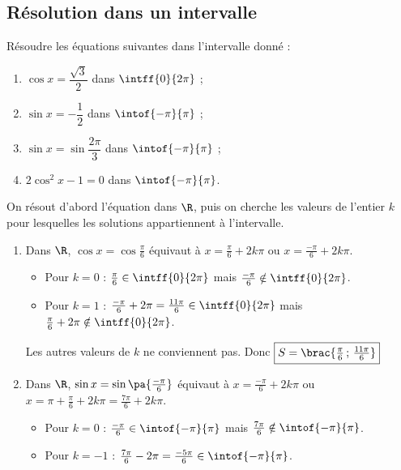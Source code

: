 \newpage

\subsection{Résolution dans un intervalle}

\begin{methode}
	Résoudre les équations suivantes dans l'intervalle donné :

	\begin{enumerate}
		\item $\cos x = \dfrac{\sqrt{3}}{2}$ dans $\intff{0}{2\pi}$ ;
		\item $\sin x = -\dfrac{1}{2}$ dans $\intof{-\pi}{\pi}$ ;
		\item $\sin x = \sin\dfrac{2\pi}{3}$ dans $\intof{-\pi}{\pi}$ ;
		\item $2\cos^2 x - 1 = 0$ dans $\intof{-\pi}{\pi}$.
	\end{enumerate}

	\begin{correction}
		On résout d'abord l'équation dans $\R$, puis on cherche les valeurs de l'entier $k$ pour lesquelles les solutions appartiennent à l'intervalle.

		\begin{enumerate}
			\item Dans $\R$, $\cos x = \cos\frac{\pi}{6}$ équivaut à $x = \frac{\pi}{6} + 2k\pi$ ou $x = \frac{-\pi}{6} + 2k\pi$.

			      \begin{itemize}
				      \item Pour $k = 0$ : $\frac{\pi}{6} \in \intff{0}{2\pi}$ mais $\frac{-\pi}{6} \notin \intff{0}{2\pi}$.
				      \item Pour $k = 1$ : $\frac{-\pi}{6} + 2\pi = \frac{11\pi}{6} \in \intff{0}{2\pi}$ mais $\frac{\pi}{6} + 2\pi \notin \intff{0}{2\pi}$.
			      \end{itemize}

			      Les autres valeurs de $k$ ne conviennent pas. Donc $\boxed{S = \brac{\tfrac{\pi}{6}\,;\,\tfrac{11\pi}{6}}}$

			\item Dans $\R$, $\sin x = \sin\pa{\frac{-\pi}{6}}$ équivaut à $x = \frac{-\pi}{6} + 2k\pi$ ou $x = \pi + \frac{\pi}{6} + 2k\pi = \frac{7\pi}{6} + 2k\pi$.

			      \begin{itemize}
				      \item Pour $k = 0$ : $\frac{-\pi}{6} \in \intof{-\pi}{\pi}$ mais $\frac{7\pi}{6} \notin \intof{-\pi}{\pi}$.
				      \item Pour $k = -1$ : $\frac{7\pi}{6} - 2\pi = \frac{-5\pi}{6} \in \intof{-\pi}{\pi}$.
			      \end{itemize}


\end{enumerate}
\end{correction}
\end{methode}
